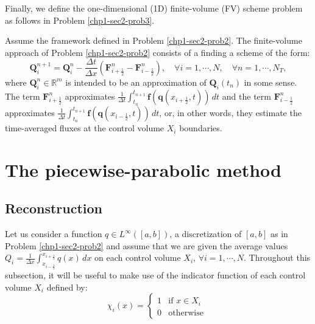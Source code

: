 Finally, we define the one-dimensional (1D) finite-volume (FV)
scheme problem as follows in Problem \ref{chp1-sec2-prob3}.
\begin{prob}[1D FV scheme]
	\label{chp1-sec2-prob3}
	Assume the framework defined in Problem \ref{chp1-sec2-prob2}.
	The finite-volume approach of Problem \ref{chp1-sec2-prob2}
	consists of a finding a scheme of the form:
        \begin{equation*}
		\mathbf{Q}_{i}^{n+1} =  \mathbf{Q}_{i}^{n} -
		\frac{\Delta t}{\Delta x} (\mathbf{F}_{i+\frac{1}{2}}^{n} - \mathbf{F}_{i-\frac{1}{2}}^{n}),
                \quad \forall i = 1, \cdots, N,
                \quad \forall n = 1, \cdots, N_T,
        \end{equation*}
	where $\mathbf{Q}_{i}^{n} \in \mathbb{R}^m$ is intended to be an approximation
	of $\mathbf{Q}_i(t_{n})$ in some sense.
	The term $\mathbf{F}_{i+\frac{1}{2}}^{n}$ approximates
	$\frac{1}{\Delta t}\int_{t_n}^{t_{n+1}} \mathbf{f}(\mathbf{q}(x_{i+\frac{1}{2}}, t)) \,dt $
	and the term
        $\mathbf{F}_{i-\frac{1}{2}}^{n}$ approximates
	$\frac{1}{\Delta t}\int_{t_n}^{t_{n+1}} \mathbf{f}(\mathbf{q}(x_{i-\frac{1}{2}}, t)) \,dt $,
	or, in other words, they estimate the time-averaged fluxes at the control volume $X_i$ boundaries.
\end{prob}

\citep{colella:1984}
\citep{carpenter:1990} 
\citep{vanleer:1977}
\citep{lin:1994}
\citep{lin:1996}

\section{The piecewise-parabolic method}
\label{chp1-sec3}

\subsection{Reconstruction}
\label{chp1-sec3-1}
Let us consider a function ${q} \in L^{\infty}([a, b])$, a discretization of
$[a,b]$ as in Problem \ref{chp1-sec2-prob2}
and assume that we are given the average values ${Q}_i = \frac{1}{\Delta x} 
\int_{x_{i-\frac{1}{2}}}^{x_{i+\frac{1}{2}}} {q}(x) \,dx$
on each control volume $X_i$, $\forall i = 1, \cdots, N $.
Throughout this subsection, it will be useful to make use of the indicator function of
each control volume $X_i$ defined by:
\begin{equation}
	\label{chp1-sec3-1-eq1}
	\chi_{i}(x)=
	\begin{cases}
		1 & \text{if } x \in X_i\\
		0 & \text{otherwise }
	\end{cases}
\end{equation}

